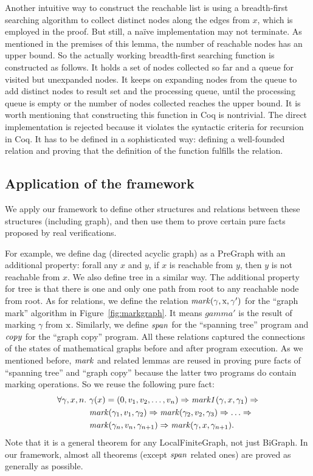 Another intuitive way to construct the reachable list is using a
breadth-first searching algorithm to collect distinct nodes along the
edges from $x$, which is employed in the proof. But still, a na\"ive
implementation may not terminate. As mentioned in the premises of this
lemma, the number of reachable nodes has an upper bound. So the
actually working breadth-first searching function is constructed as
follows. It holds a set of nodes collected so far and a queue for
visited but unexpanded nodes. It keeps on expanding nodes from the
queue to add distinct nodes to result set and the processing queue,
until the processing queue is empty or the number of nodes collected
reaches the upper bound. It is worth mentioning that constructing this
function in Coq is nontrivial. The direct implementation is rejected
because it violates the syntactic criteria for recursion in Coq. It
has to be defined in a sophisticated way: defining a well-founded
relation and proving that the definition of the function fulfills the
relation.

\subsection{Application of the framework}

We apply our framework to define other structures and relations
between these structures (including graph), and then use them to prove
certain pure facts proposed by real verifications.

For example, we define dag (directed acyclic graph) as a PreGraph with
an additional property: forall any $x$ and $y$, if $x$ is reachable
from $y$, then $y$ is not reachable from $x$. We also define tree in a
similar way. The additional property for tree is that there is one and
only one path from root to any reachable node from root. As for
relations, we define the relation $\mathit{mark}(\gamma, \text{x}, \gamma')$
for the ``graph mark'' algorithm in Figure~\ref{fig:markgraph}. It
means $gamma'$ is the result of marking $\gamma$ from $\text{x}$. Similarly, we define $\mathit{span}$ for the ``spanning tree'' program
and $\mathit{copy}$ for the ``graph copy'' program. All these relations
captured the connections of the states of mathematical graphs before
and after program execution. As we mentioned before, $\mathit{mark}$ and
related lemmas are reused in proving pure facts of ``spanning tree''
and ``graph copy'' because the latter two programs do contain marking
operations. So we reuse the following pure fact:
\begin{equation*}
\begin{split}
\forall \gamma, x, n.~&\gamma(x)=(0, v_1, v_2,\dots,v_n) => \mathit{mark1}(\gamma, x, \gamma_1) =>\\
        & \mathit{mark}(\gamma_1,v_1,\gamma_2) => \mathit{mark}(\gamma_2,v_2,\gamma_3) => \dots =>\\
        & \mathit{mark}(\gamma_n,v_n,\gamma_{n+1}) => \mathit{mark}(\gamma,x,\gamma_{n+1}).
\end{split}
\end{equation*}
Note that it is a general theorem for any LocalFiniteGraph, not just
BiGraph. In our framework, almost all theorems (except $\mathit{span}$
related ones) are proved as generally as possible.


